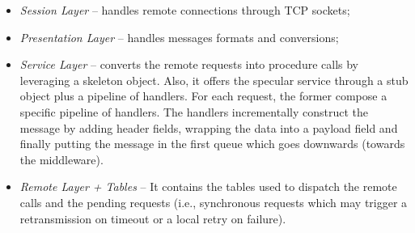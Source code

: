 \begin{itemize}
  \item \textit{Session Layer} --
  handles remote connections through TCP sockets;
  \item \textit{Presentation Layer} --
  handles messages formats and conversions;
  \item \textit{Service Layer} --
  converts the remote requests into procedure calls
  by leveraging a skeleton object.
  Also, it offers the specular service through a stub object plus a pipeline
  of handlers. For each request, the former compose a specific pipeline
  of handlers. The handlers incrementally construct the message by adding
  header fields, wrapping the data into a payload field and finally putting
  the message in the first queue which goes downwards (towards the middleware).
  \item \textit{Remote Layer + Tables} --
  It contains the tables used
  to dispatch the remote calls and the pending requests (i.e., synchronous
  requests which may trigger a retransmission on timeout or a local retry on
  failure).
\end{itemize}




